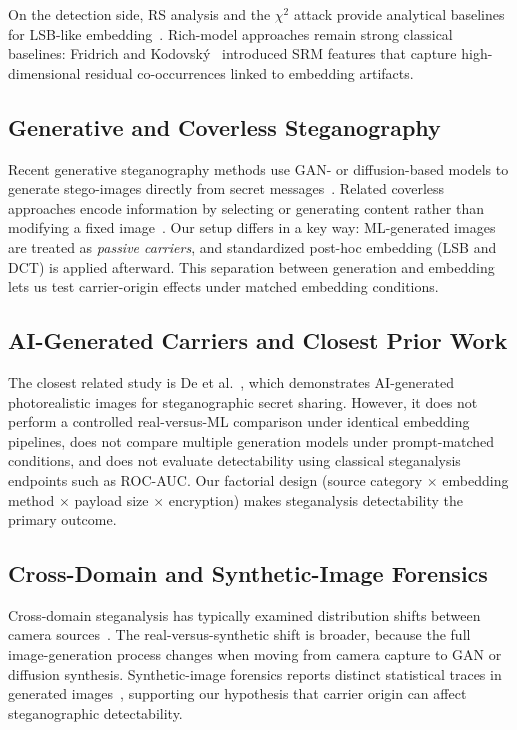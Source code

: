 \documentclass[10pt,twocolumn,a4paper]{article}
\begin{document}
On the detection side, RS analysis and the $\chi^2$ attack provide analytical baselines for LSB-like embedding~\cite{fridrich2001lsb,westfeld1999chi}. Rich-model approaches remain strong classical baselines: Fridrich and Kodovsk\'{y}~\cite{fridrich2012srm} introduced SRM features that capture high-dimensional residual co-occurrences linked to embedding artifacts.

\subsection{Generative and Coverless Steganography}
Recent generative steganography methods use GAN- or diffusion-based models to generate stego-images directly from secret messages~\cite{hu2023,liu2024}. Related coverless approaches encode information by selecting or generating content rather than modifying a fixed image~\cite{duan2020}. Our setup differs in a key way: ML-generated images are treated as \emph{passive carriers}, and standardized post-hoc embedding (LSB and DCT) is applied afterward. This separation between generation and embedding lets us test carrier-origin effects under matched embedding conditions.

\subsection{AI-Generated Carriers and Closest Prior Work}
The closest related study is De et al.~\cite{de2022ai}, which demonstrates AI-generated photorealistic images for steganographic secret sharing. However, it does not perform a controlled real-versus-ML comparison under identical embedding pipelines, does not compare multiple generation models under prompt-matched conditions, and does not evaluate detectability using classical steganalysis endpoints such as ROC-AUC. Our factorial design (source category $\times$ embedding method $\times$ payload size $\times$ encryption) makes steganalysis detectability the primary outcome.

\subsection{Cross-Domain and Synthetic-Image Forensics}
Cross-domain steganalysis has typically examined distribution shifts between camera sources~\cite{fridrich2012srm}. The real-versus-synthetic shift is broader, because the full image-generation process changes when moving from camera capture to GAN or diffusion synthesis. Synthetic-image forensics reports distinct statistical traces in generated images~\cite{wang2020cnn,corvi2023diffusion}, supporting our hypothesis that carrier origin can affect steganographic detectability.
\end{document}
